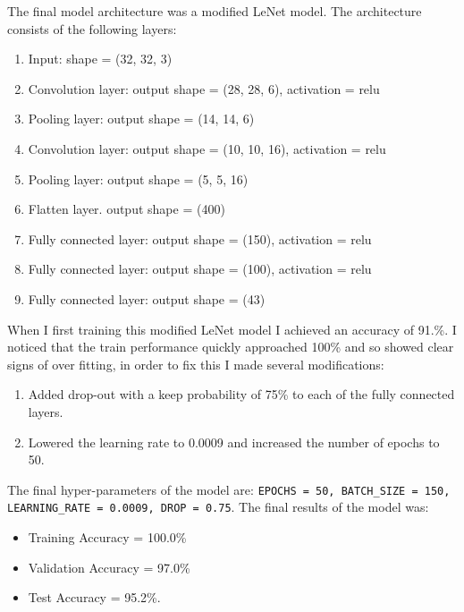 \documentclass[letterpaper,12pt]{article}
\begin{document}
The final model architecture was a modified LeNet model. The architecture consists of the following layers:
\begin{enumerate}
\item Input: shape = (32, 32, 3)
\item Convolution layer:  output shape = (28, 28, 6), activation = relu
\item Pooling layer: output shape = (14, 14, 6)
\item Convolution layer: output shape = (10, 10, 16), activation = relu
\item Pooling layer: output shape = (5, 5, 16)
\item Flatten layer.  output shape = (400)
\item Fully connected layer: output shape = (150), activation = relu
\item Fully connected layer: output shape = (100), activation = relu
\item Fully connected layer: output shape = (43)
\end{enumerate}
When I first training this modified LeNet model I achieved an accuracy of 91.\%. I noticed that the train performance quickly approached 100\% and so showed clear signs of over fitting, in order to fix this I made several modifications:
\begin{enumerate}
\item Added drop-out with a keep probability of 75\% to each of the fully connected layers.
\item Lowered the learning rate to 0.0009 and increased the number of epochs to 50.
\end{enumerate}
The final hyper-parameters of the model are: \texttt{EPOCHS = 50, BATCH\_SIZE = 150, LEARNING\_RATE = 0.0009, DROP = 0.75}. The final results of the model was:
\begin{itemize}
\item Training Accuracy = 100.0\%
\item Validation Accuracy = 97.0\%
\item Test Accuracy = 95.2\%.
\end{itemize}
\end{document}
